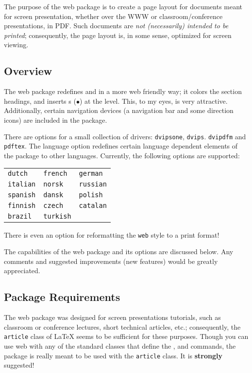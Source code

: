 \documentclass{article}
\begin{document}
The purpose of the \textsf{web} package is to create a page layout
for documents meant for screen presentation, whether over the
\textsf{WWW} or classroom/conference presentations, in
\textsf{PDF}. Such documents are \emph{not \emph{(necessarily)}
intended to be printed}; consequently, the page layout is, in some
sense, optimized for screen viewing.

\subsection{Overview}

The \textsf{web} package redefines  and
 in a more web friendly way; it colors the
section headings, and inserts s ($\bullet$) at the
 level.  This, to my eyes, is very attractive.
Additionally, certain navigation devices (a navigation bar and
some direction icons) are included in the package.

There are options for a small collection of drivers:
\texttt{dvipsone}, \texttt{dvips}. \texttt{dvipdfm} and \texttt{pdftex}.  The language
option redefines certain language dependent elements of the package
to other languages. Currently, the following options are supported:

\medskip
\begin{tabular}{lll}
\texttt{dutch}   & \texttt{french} & \texttt{german}\\
\texttt{italian} & \texttt{norsk}  & \texttt{russian}\\
\texttt{spanish} & \texttt{dansk}  & \texttt{polish}\\
\texttt{finnish} & \texttt{czech}  & \texttt{catalan}\\
\texttt{brazil}  & \texttt{turkish}
\end{tabular}
\medskip

\noindent There is even an option for reformatting the \texttt{web}
style to a print format!

The capabilities of the \textsf{web} package and its options are
discussed below. Any comments and suggested improvements (new
features) would be greatly appreciated.

\subsection{Package Requirements}

The \textsf{web} package was designed for screen presentations
tutorials, such as classroom or conference lectures, short technical
articles, etc.; consequently, the \texttt{article} class of \LaTeX{}
seems to be sufficient for these purposes.  Though you can use
\textsf{web} with any of the standard classes that define the
,  and  commands, the
package is really meant to be used with the \texttt{article}
class.  It is \textbf{strongly} suggested!
\end{document}
